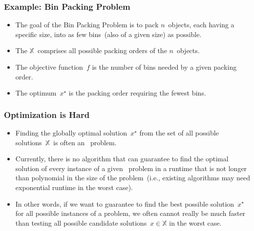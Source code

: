 \documentclass[aspectratio=169,mathserif,notheorems]{beamer}%
\gdef\searchSpace{\ensuremath{\mathbb{X}}}%
\gdef\sespel{\ensuremath{x}}%
\gdef\opti#1{\ensuremath{#1^{\star}}}%
\begin{document}
%
\begin{frame}[t]%
\frametitle{Example: Bin Packing Problem}%
\begin{itemize}%
\item The goal of the Bin Packing Problem is to pack $n$~objects, each having a specific size, into as few bins~(also of a given size) as possible.%
\item<2-> The \searchSpace\ comprises all possible packing orders of the $n$~objects.%
\item<3-> The objective function~$f$ is the number of bins needed by a given packing order.%
\item<4-> The optimum~$\opti{\sespel}$ is the packing order requiring the fewest bins.%
\end{itemize}%
%
\end{frame}%
%
\begin{frame}[t]%
\frametitle{Optimization is Hard}%
\begin{itemize}%
%
\item Finding the globally optimal solution~\opti{\sespel} from the set of all possible solutions~\searchSpace\ is often an \npHard\ problem.%
%
\item<2-> Currently, there is no algorithm that can \alert{guarantee} to find the optimal solution of \alert{every instance} of a given \npHard\ problem in a runtime that is not longer than polynomial in the size of the problem~(i.e., existing algorithms may need exponential runtime in the \alert{worst case}).%
%
\item<3-> In other words, if we want to guarantee to find the best possible solution~\opti{\sespel} for all possible instances of a problem, we often cannot really be much faster than testing all possible candidate solutions~$\sespel\in\searchSpace$ in the \alert{worst case}.%
%
\end{itemize}%
\end{frame}%
%
\end{document}
